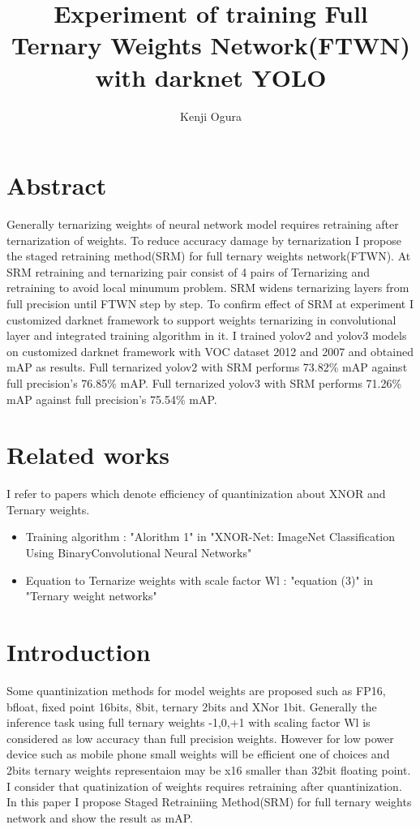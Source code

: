\documentclass[10pt,a4paper,twocolumn]{article}
\begin{document}
\title{Experiment of training Full Ternary Weights Network(FTWN) with darknet YOLO}
\author{Kenji Ogura}
\date{}
\maketitle

\section{Abstract}
Generally ternarizing weights of neural network model requires retraining after ternarization of weights.
To reduce accuracy damage by ternarization I propose the staged retraining method(SRM) for full ternary weights network(FTWN).
At SRM retraining and ternarizing pair consist of 4 pairs of Ternarizing and retraining to avoid local minumum problem.
SRM widens ternarizing layers from full precision until FTWN step by step.
To confirm effect of SRM at experiment I customized darknet framework to support weights ternarizing in convolutional layer and integrated training algorithm in it.
I trained yolov2 and yolov3 models on customized darknet framework with VOC dataset 2012 and 2007 and obtained mAP as results.
Full ternarized yolov2 with SRM performs 73.82\% mAP against full precision's 76.85\% mAP.
Full ternarized yolov3 with SRM performs 71.26\% mAP against full precision's 75.54\% mAP.

\section{Related works}

I refer to papers which denote efficiency of quantinization about XNOR and Ternary weights.
\begin{itemize}
\item
 Training algorithm : "Alorithm 1" in "XNOR-Net: ImageNet Classification Using BinaryConvolutional Neural Networks"\cite{Rastegari2015XNORNetIC}
\item
 Equation to Ternarize weights with scale factor Wl : "equation (3)" in "Ternary weight networks"\cite{Li2016TernaryWN}
\end{itemize}

\section{Introduction}

Some quantinization methods for model weights are proposed such as FP16, bfloat, fixed point 16bits, 8bit, ternary 2bits and XNor 1bit.
Generally the inference task using full ternary weights -1,0,+1 with scaling factor Wl is considered as low accuracy than full precision weights.
However for low power device such as mobile phone small weights will be efficient one of choices and 2bits ternary weights representaion may be x16 smaller than 32bit floating point.
I consider that quatinization of weights requires retraining after quantinization.
In this paper I propose Staged Retrainiing Method(SRM) for full ternary weights network and show the result as mAP.
\end{document}
